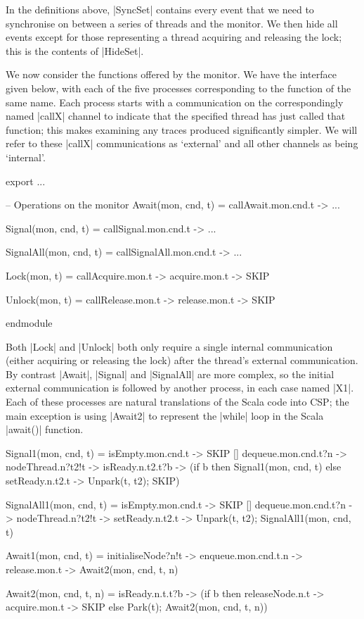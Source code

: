 In the definitions above, |SyncSet| contains every event that we need to synchronise on between a series of threads and the monitor. We then hide all events except for those representing a thread acquiring and releasing the lock; this is the contents of |HideSet|.

We now consider the functions offered by the monitor. We have the interface given below, with each of the five processes corresponding to the function of the same name. Each process starts with a communication on the correspondingly named |callX| channel to indicate that the specified thread has just called that function; this makes examining any traces produced significantly simpler. We will refer to these |callX| communications as `external' and all other channels as being `internal'. 
  
\begin{cspm}
export 
  ...

  -- Operations on the monitor
  Await(mon, cnd, t) = callAwait.mon.cnd.t -> ...

  Signal(mon, cnd, t) = callSignal.mon.cnd.t -> ...

  SignalAll(mon, cnd, t) = callSignalAll.mon.cnd.t -> ...

  Lock(mon, t) = callAcquire.mon.t -> acquire.mon.t -> SKIP

  Unlock(mon, t) = callRelease.mon.t -> release.mon.t -> SKIP

 endmodule
\end{cspm}


Both |Lock| and |Unlock| both only require a single internal communication (either acquiring or releasing the lock) after the thread's external communication. By contrast |Await|, |Signal| and |SignalAll| are more complex, so the initial external communication is followed by another process, in each case named |X1|. Each of these processes are natural translations of the Scala code into CSP; the main exception is using |Await2| to represent the |while| loop in the Scala |await()| function.

\begin{cspm}
  Signal1(mon, cnd, t) = 
       isEmpty.mon.cnd.t -> SKIP
    [] dequeue.mon.cnd.t?n -> nodeThread.n?t2!t -> isReady.n.t2.t?b ->
         (if b then Signal1(mon, cnd, t)
          else setReady.n.t2.t -> Unpark(t, t2); SKIP)

  SignalAll1(mon, cnd, t) =
       isEmpty.mon.cnd.t -> SKIP
    [] dequeue.mon.cnd.t?n -> nodeThread.n?t2!t -> setReady.n.t2.t -> 
            Unpark(t, t2); SignalAll1(mon, cnd, t)

  Await1(mon, cnd, t) = 
    initialiseNode?n!t -> enqueue.mon.cnd.t.n -> release.mon.t -> Await2(mon, cnd, t, n)

  Await2(mon, cnd, t, n) = 
    isReady.n.t.t?b -> (if b then releaseNode.n.t -> acquire.mon.t -> SKIP
                        else Park(t); Await2(mon, cnd, t, n))
\end{cspm}



